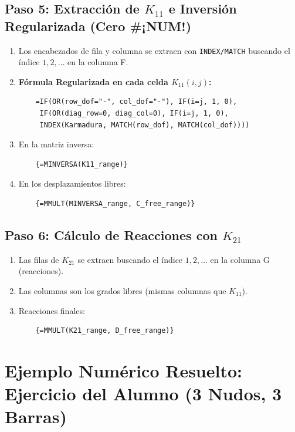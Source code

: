 \documentclass[11pt,a4paper]{article}
\begin{document}
\subsection{Paso 5: Extracción de $K_{11}$ e Inversión Regularizada (Cero \#¡NUM!)}
\begin{enumerate}
    \item Los encabezados de fila y columna se extraen con \texttt{INDEX/MATCH} buscando el índice $1, 2, \dots$ en la columna F.
    \item \textbf{Fórmula Regularizada en cada celda $K_{11}(i, j)$:}
    \begin{verbatim}
    =IF(OR(row_dof="-", col_dof="-"), IF(i=j, 1, 0),
     IF(OR(diag_row=0, diag_col=0), IF(i=j, 1, 0),
     INDEX(Karmadura, MATCH(row_dof), MATCH(col_dof))))
    \end{verbatim}
    \item En la matriz inversa:
    \begin{verbatim}
    {=MINVERSA(K11_range)}
    \end{verbatim}
    \item En los desplazamientos libres:
    \begin{verbatim}
    {=MMULT(MINVERSA_range, C_free_range)}
    \end{verbatim}
\end{enumerate}

\subsection{Paso 6: Cálculo de Reacciones con $K_{21}$}
\begin{enumerate}
    \item Las filas de $K_{21}$ se extraen buscando el índice $1, 2, \dots$ en la columna G (reacciones).
    \item Las columnas son los grados libres (mismas columnas que $K_{11}$).
    \item Reacciones finales:
    \begin{verbatim}
    {=MMULT(K21_range, D_free_range)}
    \end{verbatim}
\end{enumerate}

\section{Ejemplo Numérico Resuelto: Ejercicio del Alumno (3 Nudos, 3 Barras)}
\end{document}
